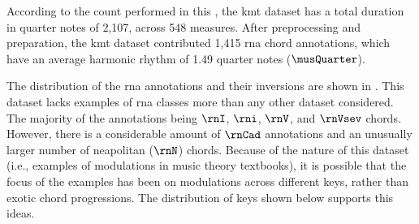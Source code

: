 
According to the count performed in this \thesisdiss{}, the
\gls{kmt} dataset has a total duration in quarter notes of
2,107, across 548 measures. After preprocessing and
preparation, the \gls{kmt} dataset contributed 1,415
\gls{rna} chord annotations, which have an average harmonic
rhythm of 1.49 quarter notes ($\musQuarter$).

The distribution of the \gls{rna} annotations and their
inversions are shown in . This
dataset lacks examples of \gls{rna} classes more than any
other dataset considered. The majority of the annotations
being $\rnI$, $\rni$, $\rnV$, and $\rnVsev$ chords. However,
there is a considerable amount of $\rnCad$ annotations and
an unusually larger number of \gls{neapolitan} ($\rnN$)
chords. Because of the nature of this dataset (i.e.,
examples of modulations in music theory textbooks), it is
possible that the focus of the examples has been on
modulations across different keys, rather than exotic chord
progressions. The distribution of keys shown below supports
this ideas.




